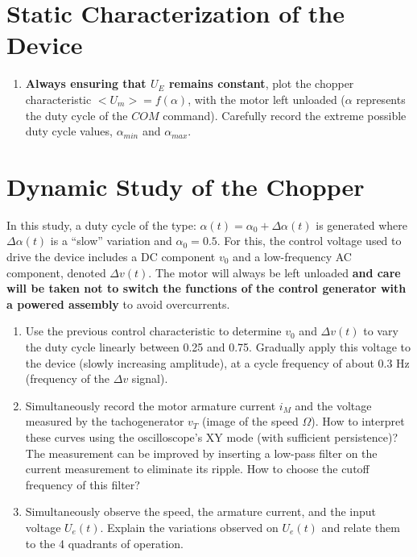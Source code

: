 \section{Static Characterization of the Device}

\begin{enumerate}[label={}]
\item \textbf{Always ensuring that $U_E$ remains constant}, plot the chopper characteristic $<U_m>=f(\alpha)$, with the motor left unloaded ($\alpha$ represents the duty cycle of the $COM$ command). Carefully record the extreme possible duty cycle values, $\alpha_{min}$ and $\alpha_{max}$.
\end{enumerate}

\section{Dynamic Study of the Chopper}

In this study, a duty cycle of the type: $\alpha(t) = \alpha_0 + \Delta\alpha(t)$ is generated where $\Delta\alpha(t)$ is a ``slow'' variation and $\alpha_0 = 0.5$. For this, the control voltage used to drive the device includes a DC component $v_0$ and a low-frequency AC component, denoted $\Delta v(t)$. The motor will always be left unloaded \textbf{and care will be taken not to switch the functions of the control generator with a powered assembly} to avoid overcurrents.

\begin{enumerate}
\item Use the previous control characteristic to determine $v_0$ and $\Delta v(t)$ to vary the duty cycle linearly between 0.25 and 0.75. Gradually apply this voltage to the device (slowly increasing amplitude), at a cycle frequency of about 0.3 Hz (frequency of the $\Delta v$ signal).

\item Simultaneously record the motor armature current $i_M$ and the voltage measured by the tachogenerator $v_T$ (image of the speed $\Omega$). How to interpret these curves using the oscilloscope's XY mode (with sufficient persistence)? The measurement can be improved by inserting a low-pass filter on the current measurement to eliminate its ripple. How to choose the cutoff frequency of this filter?

\item Simultaneously observe the speed, the armature current, and the input voltage $U_e(t)$. Explain the variations observed on $U_e(t)$ and relate them to the 4 quadrants of operation.
\end{enumerate}

